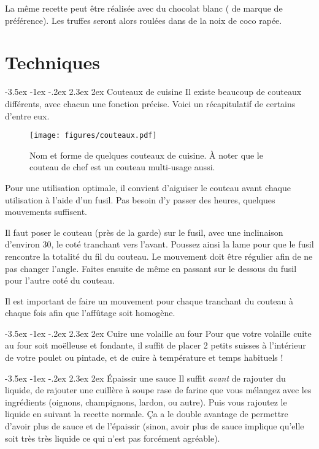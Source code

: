\documentclass[a4paper,twoside]{report}
\makeatletter
\renewcommand{\section}{\@startsection{section}{1}{\z@}%
             {-3.5ex \@plus -1ex \@minus -.2ex}%
             {2.3ex \@plus 2ex}%
             {\normalfont\Large\scshape\bfseries\marou}}
\makeatother
\begin{document}
La même recette peut être réalisée avec du chocolat blanc ( de marque de préférence). Les truffes seront alors roulées dans de la noix de coco rapée.

\chapter{Techniques}
\minitoc

\section{Couteaux de cuisine}
Il existe beaucoup de couteaux différents, avec chacun une fonction précise. Voici un récapitulatif de certains d'entre eux.

\begin{figure}[htb]
\centering
\texttt{[image: figures/couteaux.pdf]}
\caption{Nom et forme de quelques couteaux de cuisine. À noter que le couteau de chef est un couteau multi-usage aussi.}
\end{figure}

\begin{remarque}
Pour une utilisation optimale, il convient d'aiguiser le couteau avant chaque utilisation à l'aide d'un fusil. Pas besoin d'y passer des heures, quelques mouvements suffisent.

Il faut poser le couteau (près de la garde) sur le fusil, avec une inclinaison d'environ 30\degre, le coté tranchant vers l'avant. Poussez ainsi la lame pour que le fusil rencontre la totalité du fil du couteau. Le mouvement doit être régulier afin de ne pas changer l'angle. Faites ensuite de même en passant sur le dessous du fusil pour l'autre coté du couteau.

Il est important de faire un mouvement pour chaque tranchant du couteau à chaque fois afin que l'affûtage soit homogène.
\end{remarque}


\section{Cuire une volaille au four}
Pour que votre volaille cuite au four soit moëlleuse et fondante, il suffit de placer 2 petits suisses à l'intérieur de votre poulet ou pintade, et de cuire à température et temps habituels !

\section{Épaissir une sauce}
Il suffit \emph{avant} de rajouter du liquide, de rajouter une cuillère à soupe rase de farine que vous mélangez avec les ingrédients (oignons, champignons, lardon, ou autre). Puis vous rajoutez le liquide en suivant la recette normale. Ça a le double avantage de permettre d'avoir plus de sauce et de l'épaissir (sinon, avoir plus de sauce implique qu'elle soit très très liquide ce qui n'est pas forcément agréable).
\end{document}
